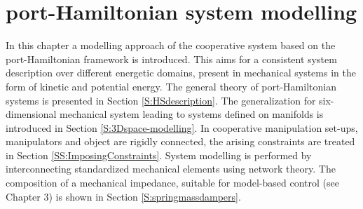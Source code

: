 \documentclass[a4paper,twoside, openright,12pt]{report}
\begin{document}
\chapter{port-Hamiltonian system modelling}\label{C:pHS modelling}
In this chapter a modelling approach of the cooperative   system based on the port-Hamiltonian framework is introduced. This aims for a consistent system description over different energetic domains, present in mechanical systems in the form of kinetic and potential energy. The general theory of port-Hamiltonian systems is presented in Section \ref{S:HSdescription}. The generalization for six-dimensional mechanical system leading to systems defined on manifolds is introduced in Section \ref{S:3Dspace-modelling}. In cooperative manipulation set-ups, manipulators and object are rigidly connected, the arising constraints are treated in Section \ref{SS:ImposingConstraints}. 
System modelling is performed by interconnecting standardized mechanical elements using network theory. The composition of a mechanical impedance, suitable for model-based control (see Chapter 3) is shown in Section \ref{S:springmassdampers}.
  
\end{document}
